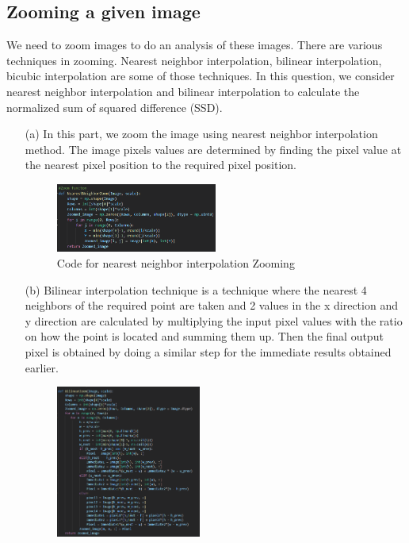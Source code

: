 \documentclass[11pt]{article}
\begin{document}
\begin{flushleft}
\section{Zooming a given image}
We need to zoom images to do an analysis of these images. There are various techniques in zooming. Nearest neighbor interpolation, bilinear interpolation, bicubic interpolation are some of those techniques. In this question, we consider nearest neighbor interpolation and bilinear interpolation to calculate the normalized sum of squared difference (SSD).  
\begin{itemize}
    \item[(a)] In this part, we zoom the image using nearest neighbor interpolation method. The image pixels values are determined by finding the pixel value at the nearest pixel position to the required pixel position.
    \begin{figure}[htp]
        \centering
        \includegraphics[width=0.5\textwidth]{Question5acode.png}
        \caption{Code for nearest neighbor interpolation Zooming}
    \end{figure}
    \item[(b)] Bilinear interpolation technique is a technique where the nearest 4 neighbors of the required point are taken and 2 values in the x direction and y direction are calculated by multiplying the input pixel values with the ratio on how the point is located and summing them up. Then the final output pixel is obtained by doing a similar step for the immediate results obtained earlier.
    \begin{figure}[htp]
        \centering
        \includegraphics[width=0.45\textwidth]{Question5bcode.png}

\end{figure}
\end{itemize}
\end{flushleft}
\end{document}
